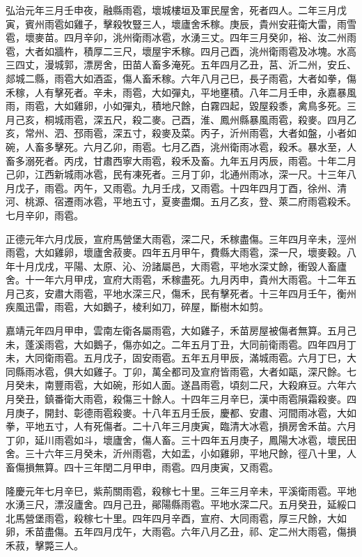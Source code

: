 \begin{pinyinscope}
弘治元年三月壬申夜，融縣雨雹，壞城樓垣及軍民屋舍，死者四人。二年三月戊寅，賓州雨雹如雞子，擊殺牧豎三人，壞廬舍禾稼。庚辰，貴州安莊衛大雷，雨雪雹，壞麥苗。四月辛卯，洮州衛雨冰雹，水湧三丈。四年三月癸卯，裕、汝二州雨雹，大者如牆杵，積厚二三尺，壞屋宇禾稼。四月己酉，洮州衛雨雹及冰塊。水高三四丈，漫城郭，漂房舍，田苗人畜多淹死。五年四月乙丑，莒、沂二州，安丘、郯城二縣，雨雹大如酒盃，傷人畜禾稼。六年八月己巳，長子雨雹，大者如拳，傷禾稼，人有擊死者。辛未，雨雹，大如彈丸，平地壅積。八年二月壬申，永嘉暴風雨，雨雹，大如雞卵，小如彈丸，積地尺餘，白霧四起，毀屋殺黍，禽鳥多死。三月己亥，桐城雨雹，深五尺，殺二麥。己酉，淮、鳳州縣暴風雨雹，殺麥。四月乙亥，常州、泗、邳雨雹，深五寸，殺麥及菜。丙子，沂州雨雹，大者如盤，小者如碗，人畜多擊死。六月乙卯，雨雹。七月乙酉，洮州衛雨冰雹，殺禾。暴水至，人畜多溺死者。丙戌，甘肅西寧大雨雹，殺禾及畜。九年五月丙辰，雨雹。十年二月己卯，江西新城雨冰雹，民有凍死者。三月丁卯，北通州雨冰，深一尺。十三年八月戊子，雨雹。丙午，又雨雹。九月壬戌，又雨雹。十四年四月丁酉，徐州、清河、桃源、宿遷雨冰雹，平地五寸，夏麥盡爛。五月乙亥，登、萊二府雨雹殺禾。七月辛卯，雨雹。

正德元年六月戊辰，宣府馬營堡大雨雹，深二尺，禾稼盡傷。三年四月辛未，涇州雨雹，大如雞卵，壞廬舍菽麥。四年五月甲午，費縣大雨雹，深一尺，壞麥穀。八年十月戊戌，平陽、太原、沁、汾諸屬邑，大雨雹，平地水深丈餘，衝毀人畜廬舍。十一年六月甲戌，宣府大雨雹，禾稼盡死。九月丙申，貴州大雨雹。十二年五月己亥，安肅大雨雹，平地水深三尺，傷禾，民有擊死者。十三年四月壬午，衡州疾風迅雷，雨雹，大如鵝子，棱利如刀，碎屋，斷樹木如剪。

嘉靖元年四月甲申，雲南左衛各屬雨雹，大如雞子，禾苗房屋被傷者無算。五月己未，蓬溪雨雹，大如鵝子，傷亦如之。二年五月丁丑，大同前衛雨雹。四年四月丁未，大同衛雨雹。五月戊子，固安雨雹。五年五月甲辰，滿城雨雹。六月丁巳，大同縣雨冰雹，俱大如雞子。丁卯，萬全都司及宣府皆雨雹，大者如甌，深尺餘。七月癸未，南豐雨雹，大如碗，形如人面。遂昌雨雹，頃刻二尺，大殺麻豆。六年六月癸丑，鎮番衛大雨雹，殺傷三十餘人。十四年三月辛巳，漢中雨雹隕霜殺麥。四月庚子，開封、彰德雨雹殺麥。十八年五月壬辰，慶都、安肅、河間雨冰雹，大如拳，平地五寸，人有死傷者。二十八年三月庚寅，臨清大冰雹，損房舍禾苗。六月丁卯，延川雨雹如斗，壞廬舍，傷人畜。三十四年五月庚子，鳳陽大冰雹，壞民田舍。三十六年三月癸未，沂州雨雹，大如盂，小如雞卵，平地尺餘，徑八十里，人畜傷損無算。四十三年閏二月甲申，雨雹。四月庚寅，又雨雹。

隆慶元年七月辛巳，紫荊關雨雹，殺稼七十里。三年三月辛未，平溪衛雨雹。平地水湧三尺，漂沒廬舍。四月己丑，鄖陽縣雨雹。平地水深二尺。五月癸丑，延綏口北馬營堡雨雹，殺稼七十里。四年四月辛酉，宣府、大同雨雹，厚三尺餘，大如卵，禾苗盡傷。五年四月戊午，大雨雹。六年八月乙丑，祁、定二州大雨雹，傷損禾菽，擊斃三人。


\end{pinyinscope}
